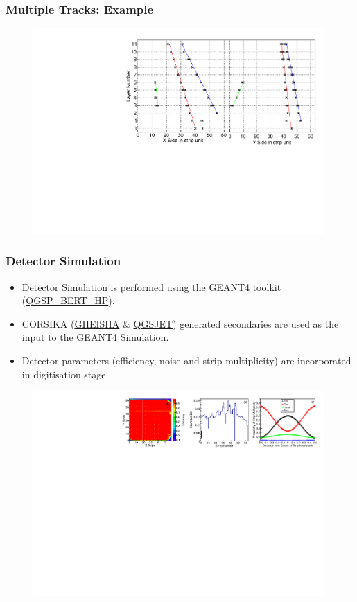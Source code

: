 \documentclass{beamer}
\begin{document}
\begin{frame}
  \frametitle{Multiple Tracks: Example}
  \begin{figure}[!h]
    \includegraphics[width=0.99\textwidth]{Multi_Event_20170823_102605_9676_Roof_1.pdf}
  \end{figure}
\end{frame}


\begin{frame}
  \frametitle{Detector Simulation}
  \begin{itemize} %
  \item Detector Simulation is performed using the GEANT4 toolkit
    (\url{QGSP_BERT_HP}).
  \item CORSIKA (\url{GHEISHA} \& \url{QGSJET}) generated secondaries
    are used as the input to the GEANT4 Simulation.
  \item Detector parameters (efficiency, noise and strip
    multiplicity) are incorporated in digitisation stage.
  \end{itemize}
  \begin{figure}[!h]
    \includegraphics[width=0.99\textwidth]{layer2properties.pdf}
  \end{figure}
\end{frame}
\end{document}
